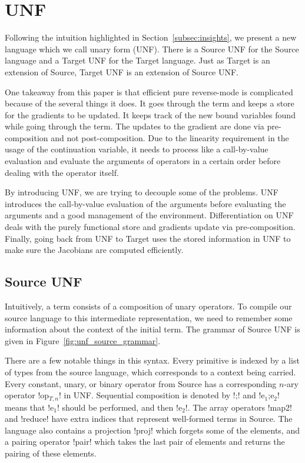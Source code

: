\section{UNF}
\label{sec:unf}

Following the intuition highlighted in Section~\ref{subsec:insights}, 
we present a new language which we call unary form (UNF). 
There is a Source UNF for the Source language and a Target UNF for the Target language.
Just as Target is an extension of Source, Target UNF is an extension of Source UNF.

One takeaway from this paper is that efficient pure reverse-mode is complicated because of the several things it does.
It goes through the term and keeps a store for the gradients to be updated. 
It keeps track of the new bound variables found while going through the term.
The updates to the gradient are done via pre-composition and not post-composition.
Due to the linearity requirement in the usage of the continuation variable, 
it needs to process like a call-by-value evaluation and evaluate the arguments of operators in a certain order before 
dealing with the operator itself.

By introducing UNF, we are trying to decouple some of the problems.
UNF introduces the call-by-value evaluation of the arguments before evaluating the arguments and a good management of the environment.
Differentiation on UNF deals with the purely functional store and gradients update via pre-composition.
Finally, going back from UNF to Target uses the stored information in UNF to make sure the Jacobians are computed efficiently. 

\subsection{Source UNF} %
\label{sub:Source UNF}

Intuitively, a term consists of a composition of unary operators. 
To compile our source language to this intermediate representation, 
we need to remember some information about the context of the initial term. 
The grammar of Source UNF is given in Figure~\ref{fig:unf_source_grammar}. 



There are a few notable things in this syntax. 
Every primitive is indexed by a list of types from the source language, 
which corresponds to a context being carried. 
Every constant, unary, or binary operator from Source has a corresponding $n$-ary operator !op$_{T,n}$! in UNF.
Sequential composition is denoted by !;! and !e$_{1}$;e$_{2}$! means that !e$_{1}$! should be performed, and then !e$_{2}$!.
The array operators !map2! and !reduce! have extra indices that represent well-formed terms in Source.
The language also contains a projection !proj! which forgets some of the elements, 
and a pairing operator !pair! which takes the last pair of elements and returns the pairing of these elements.

